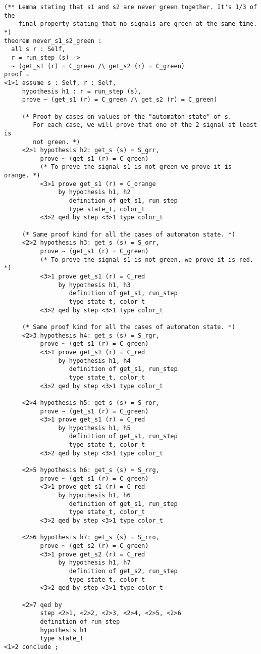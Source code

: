 {\scriptsize
\begin{lstlisting}
(** Lemma stating that s1 and s2 are never green together. It's 1/3 of the
    final property stating that no signals are green at the same time. *)
theorem never_s1_s2_green :
  all s r : Self,
  r = run_step (s) ->
  ~ (get_s1 (r) = C_green /\ get_s2 (r) = C_green)
proof =
<1>1 assume s : Self, r : Self,
     hypothesis h1 : r = run_step (s),
     prove ~ (get_s1 (r) = C_green /\ get_s2 (r) = C_green)

     (* Proof by cases on values of the "automaton state" of s.
        For each case, we will prove that one of the 2 signal at least is
        not green. *)
     <2>1 hypothesis h2: get_s (s) = S_grr,
          prove ~ (get_s1 (r) = C_green)
          (* To prove the signal s1 is not green we prove it is orange. *)
          <3>1 prove get_s1 (r) = C_orange
               by hypothesis h1, h2
                  definition of get_s1, run_step
                  type state_t, color_t
          <3>2 qed by step <3>1 type color_t

     (* Same proof kind for all the cases of automaton state. *)
     <2>2 hypothesis h3: get_s (s) = S_orr,
          prove ~ (get_s1 (r) = C_green)
          (* To prove the signal s1 is not green, we prove it is red. *)
          <3>1 prove get_s1 (r) = C_red
               by hypothesis h1, h3
                  definition of get_s1, run_step
                  type state_t, color_t
          <3>2 qed by step <3>1 type color_t

     (* Same proof kind for all the cases of automaton state. *)
     <2>3 hypothesis h4: get_s (s) = S_rgr,
          prove ~ (get_s1 (r) = C_green)
          <3>1 prove get_s1 (r) = C_red
               by hypothesis h1, h4
                  definition of get_s1, run_step
                  type state_t, color_t
          <3>2 qed by step <3>1 type color_t

     <2>4 hypothesis h5: get_s (s) = S_ror,
          prove ~ (get_s1 (r) = C_green)
          <3>1 prove get_s1 (r) = C_red
               by hypothesis h1, h5
                  definition of get_s1, run_step
                  type state_t, color_t
          <3>2 qed by step <3>1 type color_t

     <2>5 hypothesis h6: get_s (s) = S_rrg,
          prove ~ (get_s1 (r) = C_green)
          <3>1 prove get_s1 (r) = C_red
               by hypothesis h1, h6
                  definition of get_s1, run_step
                  type state_t, color_t
          <3>2 qed by step <3>1 type color_t

     <2>6 hypothesis h7: get_s (s) = S_rro,
          prove ~ (get_s2 (r) = C_green)
          <3>1 prove get_s2 (r) = C_red
               by hypothesis h1, h7
                  definition of get_s2, run_step
                  type state_t, color_t
          <3>2 qed by step <3>1 type color_t

     <2>7 qed by
          step <2>1, <2>2, <2>3, <2>4, <2>5, <2>6
          definition of run_step
          hypothesis h1
          type state_t
<1>2 conclude ;
\end{lstlisting}}


